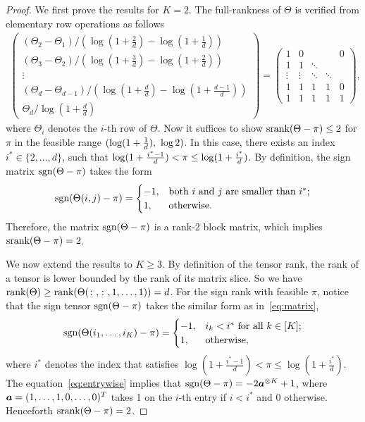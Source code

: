 \documentclass[11pt]{article}
\theoremstyle{plain}
\theoremstyle{definition}
\def\sign{\textup{sgn}}
\def\srank{\textup{srank}}
\def\rank{\textup{rank}}
\begin{document}
\begin{proof}
We first prove the results for $K=2$. The full-rankness of $\Theta$ is verified from elementary row operations as follows
\begin{align}
\begin{pmatrix}
(\Theta_2-\Theta_1)/(\log(1+\frac{2}{d})-\log(1+\frac{1}{d}))\\(\Theta_3-\Theta_2)/(\log(1+\frac{3}{d})-\log(1+\frac{2}{d}))\\\vdots\\ (\Theta_d-\Theta_{d-1})/(\log(1+\frac{d}{d})-\log(1+\frac{d-1}{d}))\\\Theta_d/\log(1+\frac{d}{d})
\end{pmatrix} = \begin{pmatrix}
 1&          0  &        &              &          0 \\
1& 1 & \ddots &              &            \\
      \vdots &     \vdots & \ddots &       \ddots &            \\
 1 & 1 &1 & 1 &0\\
 1 & 1 &1 & 1 &1
\end{pmatrix},
\end{align}
where $\Theta_i$ denotes the $i$-th row of $\Theta$. 
Now it suffices to show $\srank(\Theta-\pi)\leq 2$ for $\pi$ in the feasible range $(\log(1+{1\over d}),\ \log 2)$. In this case, there exists an index $i^*\in\{2,\ldots,d\}$, such that $\log(1+{i^*-1\over d})< \pi\leq \log(1+{i^*\over d})$. By definition, the sign matrix $\sign (\Theta-\pi)$ takes the form
\begin{equation}\label{eq:matrix}
\sign (\Theta(i,j)-\pi)=
\begin{cases}
-1, & \text{both $i$ and $j$ are smaller than $i^*$};\\
1, & \text{otherwise}.
\end{cases}
\end{equation}
Therefore, the matrix $\sign (\Theta-\pi)$ is a rank-2 block matrix, which implies $\srank(\Theta-\pi)=2$. 

We now extend the results to $K\geq 3$. By definition of the tensor rank, the rank of a tensor is lower bounded by the rank of its matrix slice.  So we have $\rank(\Theta)\geq \rank(\Theta(\colon,\colon,1,\ldots,1))=d$. For the sign rank with feasible $\pi$, notice that the sign tensor $\sign(\Theta-\pi)$ takes the similar form as in~\eqref{eq:matrix},
\begin{equation}\label{eq:entrywise}
\sign (\Theta(i_1,\ldots,i_K)-\pi)=
\begin{cases}
-1, & \text{$i_k<i^*$ for all $k\in[K]$};\\
1, & \text{otherwise},
\end{cases}
\end{equation}
where $i^*$ denotes the index that satisfies $\log(1+\frac{i^*-1}{d})<\pi\leq \log(1+\frac{i^*}{d})$.
The equation~\eqref{eq:entrywise} implies that $\sign(\Theta-\pi)=-2\ma^{\otimes K}+1$, where $\bm{a}=(1,\ldots,1,0,\ldots,0)^T$ takes 1 on the $i$-th entry if $i<i^*$ and 0 otherwise. Henceforth $\srank(\Theta-\pi)=2$. 
\end{proof}
\end{document}
